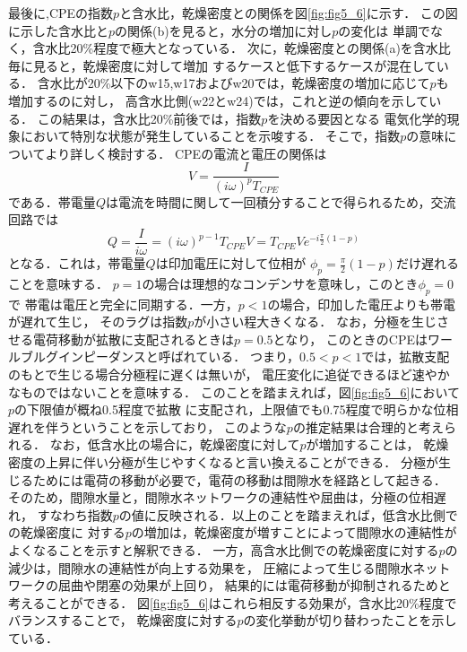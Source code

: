 最後に,CPEの指数$p$と含水比，乾燥密度との関係を図\ref{fig:fig5_6}に示す．
この図に示した含水比と$p$の関係(b)を見ると，水分の増加に対し$p$の変化は
単調でなく，含水比20\%程度で極大となっている．
次に，乾燥密度との関係(a)を含水比毎に見ると，乾燥密度に対して増加
するケースと低下するケースが混在している．
含水比が20\%以下のw15,w17およびw20では，乾燥密度の増加に応じて$p$も増加するのに対し，
高含水比側(w22とw24)では，これと逆の傾向を示している．
この結果は，含水比20\%前後では，指数$p$を決める要因となる
電気化学的現象において特別な状態が発生していることを示唆する．
そこで，指数$p$の意味についてより詳しく検討する．
CPEの電流と電圧の関係は
\begin{equation}
	V=\frac{I}{(i\omega )^pT_{CPE}}
	\label{eqn:}
\end{equation}
である．帯電量$Q$は電流を時間に関して一回積分することで得られるため，交流回路では
\begin{equation}
	Q=\frac{I}{i \omega}=(i\omega)^{p-1}T_{CPE}V=T_{CPE}Ve^{-i\frac{\pi}{2}(1-p)}
	\label{eqn:}
\end{equation}
となる．これは，帯電量$Q$は印加電圧に対して位相が
$\phi_p=\frac{\pi}{2}(1-p)$だけ遅れることを意味する．
$p=1$の場合は理想的なコンデンサを意味し，このとき$\phi_p=0$で
帯電は電圧と完全に同期する．一方，$p<1$の場合，印加した電圧よりも帯電が遅れて生じ，
そのラグは指数$p$が小さい程大きくなる．
なお，分極を生じさせる電荷移動が拡散に支配されるときは$p=0.5$となり，
このときのCPEはワールブルグインピーダンスと呼ばれている．
つまり，$0.5<p<1$では，拡散支配のもとで生じる場合分極程に遅くは無いが，
電圧変化に追従できるほど速やかなものではないことを意味する．
このことを踏まえれば，図\ref{fig:fig5_6}において$p$の下限値が概ね0.5程度で拡散
に支配され，上限値でも0.75程度で明らかな位相遅れを伴うということを示しており，
このような$p$の推定結果は合理的と考えられる．
なお，低含水比の場合に，乾燥密度に対して$p$が増加することは，
乾燥密度の上昇に伴い分極が生じやすくなると言い換えることができる．
分極が生じるためには電荷の移動が必要で，電荷の移動は間隙水を経路として起きる．
そのため，間隙水量と，間隙水ネットワークの連結性や屈曲は，分極の位相遅れ，
すなわち指数$p$の値に反映される．以上のことを踏まえれば，低含水比側での乾燥密度に
対する$p$の増加は，乾燥密度が増すことによって間隙水の連結性がよくなることを示すと解釈できる．
一方，高含水比側での乾燥密度に対する$p$の減少は，間隙水の連結性が向上する効果を，
圧縮によって生じる間隙水ネットワークの屈曲や閉塞の効果が上回り，
結果的には電荷移動が抑制されるためと考えることができる．
図\ref{fig:fig5_6}はこれら相反する効果が，含水比20\%程度でバランスすることで，
乾燥密度に対する$p$の変化挙動が切り替わったことを示している．
